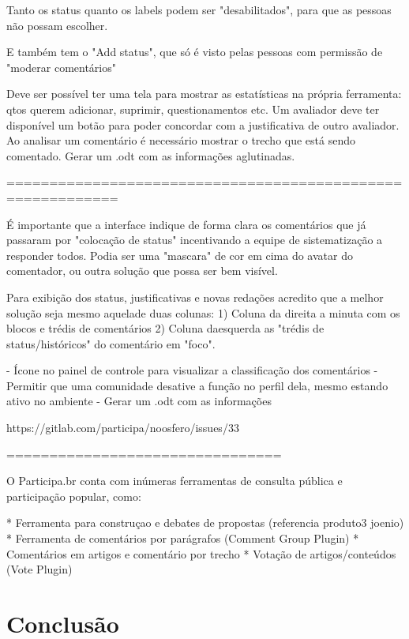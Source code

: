 \documentclass[12pt]{article}
\begin{document}
Tanto os status quanto os labels podem ser "desabilitados", para que as
pessoas não possam escolher.

E também tem o "Add status", que só é visto pelas pessoas com permissão de "moderar comentários"

Deve ser possível ter uma tela para mostrar as estatísticas na própria
ferramenta: qtos querem adicionar, suprimir, questionamentos etc.
Um avaliador deve ter disponível um botão para poder concordar com a
justificativa de outro avaliador. Ao analisar um comentário é necessário
mostrar o trecho que está sendo comentado. Gerar um .odt com as informações
aglutinadas.

===========================================================

É importante que a interface indique de forma clara os comentários que já passaram por "colocação de status" incentivando a equipe de sistematização a responder todos. Podia ser uma "mascara" de cor em cima do avatar do comentador, ou outra solução que possa ser bem visível. 

Para exibição dos status, justificativas e novas redações acredito que a melhor solução seja mesmo aquelade duas colunas: 1) Coluna da direita a minuta com os blocos e trédis de comentários 2) Coluna daesquerda as "trédis de status/históricos" do comentário em "foco".
 
 - Ícone no painel de controle para visualizar a classificação dos comentários
 - Permitir que uma comunidade desative a função no perfil dela, mesmo estando ativo no ambiente
 - Gerar um .odt com as informações

https://gitlab.com/participa/noosfero/issues/33

================================

O Participa.br conta com inúmeras ferramentas de consulta pública e
participação popular, como:

* Ferramenta para construçao e debates de propostas (referencia produto3 joenio)
* Ferramenta de comentários por parágrafos (Comment Group Plugin)
* Comentários em artigos e comentário por trecho
* Votação de artigos/conteúdos (Vote Plugin)


\section{Conclusão}
\end{document}
